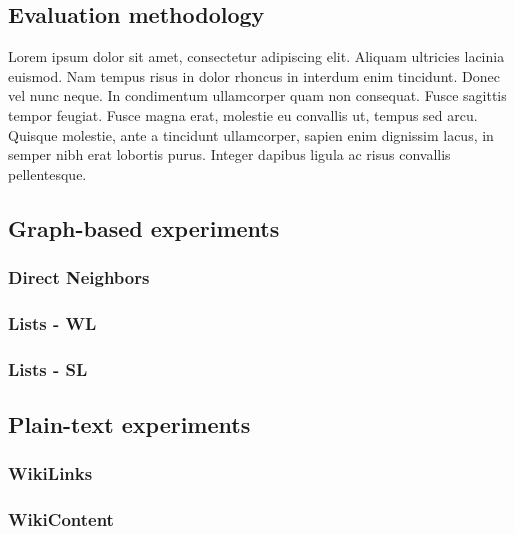 \subsection{Evaluation methodology}
Lorem ipsum dolor sit amet, consectetur adipiscing elit. Aliquam ultricies lacinia euismod. Nam tempus risus in dolor rhoncus in interdum enim tincidunt. Donec vel nunc neque. In condimentum ullamcorper quam non consequat. Fusce sagittis tempor feugiat. Fusce magna erat, molestie eu convallis ut, tempus sed arcu. Quisque molestie, ante a tincidunt ullamcorper, sapien enim dignissim lacus, in semper nibh erat lobortis purus. Integer dapibus ligula ac risus convallis pellentesque.

\subsection{Graph-based experiments} %
\label{sub:graph_based_experiments}
\subsubsection{Direct Neighbors}
\subsubsection{Lists - WL}
\subsubsection{Lists - SL}


\subsection{Plain-text experiments}
\subsubsection{WikiLinks}
\subsubsection{WikiContent}
